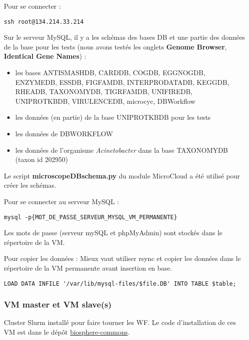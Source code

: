 Pour se connecter : 
\begin{lstlisting}[style=bash]
ssh root@134.214.33.214
\end{lstlisting}
\bigskip

Sur le serveur MySQL, il y a les schémas des bases DB et une partie des données de la base pour les tests (nous avons testés les onglets \textbf{Genome Browser}, \textbf{Identical Gene Names}) :
\begin{itemize}
	\item les bases ANTISMASHDB, CARDDB, COGDB, EGGNOGDB, ENZYMEDB, ESSDB, FIGFAMDB, INTERPRODATADB, KEGGDB, RHEADB, TAXONOMYDB, TIGRFAMDB, UNIFIREDB, UNIPROTKBDB, VIRULENCEDB, microcyc, DBWorkflow
	\item les données (en partie) de la base UNIPROTKBDB pour les tests
	\item les données de DBWORKFLOW
	\item les données de l'organisme \textit{Acinetobacter} dans la base TAXONOMYDB (taxon id 202950)
\end{itemize}

Le script \textbf{microscopeDBschema.py} du module MicroCloud a été utilisé pour créer les schémas.
\newline

Pour se connecter au serveur MySQL :
\begin{lstlisting}[style=bash]
mysql -p{MOT_DE_PASSE_SERVEUR_MYSQL_VM_PERMANENTE}
\end{lstlisting}
\bigskip

Les mots de passe (serveur mySQL et phpMyAdmin) sont stockés dans le répertoire  de la VM.
\newline 

Pour copier les données :
Mieux vaut utiliser rsync et copier les données dans le répertoire  de la VM permanente avant insertion en base.\\

\begin{lstlisting}[style=bash]
LOAD DATA INFILE '/var/lib/mysql-files/$file.DB' INTO TABLE $table;
\end{lstlisting}

\subsubsection{VM master et VM slave(s)}
Cluster Slurm installé pour faire tourner les WF. Le code d’installation de ces VM est dans le dépôt \href{https://github.com/IFB-ElixirFr/biosphere-commons}{biosphere-commons}.
\newline

